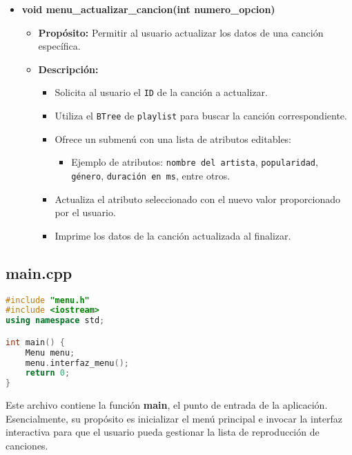 \documentclass[corference]{IEEEtran}
\begin{document}
\begin{flushleft}
\begin{itemize}
                \item \textbf{void menu\_actualizar\_cancion(int numero\_opcion)}
                \begin{itemize}
                    \item \textbf{Propósito:} 
                    Permitir al usuario actualizar los datos de una canción específica.
                    \item \textbf{Descripción:} 
                    \begin{itemize}
                        \item Solicita al usuario el \texttt{ID} de la canción a actualizar.
                        \item Utiliza el \texttt{BTree} de \texttt{playlist} para buscar la canción correspondiente.
                        \item Ofrece un submenú con una lista de atributos editables:
                        \begin{itemize}
                            \item Ejemplo de atributos: \texttt{nombre del artista}, \texttt{popularidad}, \texttt{género}, \texttt{duración en ms}, entre otros.
                        \end{itemize}
                        \item Actualiza el atributo seleccionado con el nuevo valor proporcionado por el usuario.
                        \item Imprime los datos de la canción actualizada al finalizar.
                    \end{itemize}
                \end{itemize}
            \end{itemize}

            \subsection{main.cpp}

            \begin{lstlisting}[language=C++, style=mystyle, caption={Código del main}]
#include "menu.h"
#include <iostream>
using namespace std;

int main() {
    Menu menu;
    menu.interfaz_menu();
    return 0;
}
            \end{lstlisting}

        \noindent\hspace*{4em}Este archivo contiene la función \textbf{main}, el punto de entrada de la aplicación. Esencialmente, su propósito es inicializar el menú principal e invocar la interfaz interactiva para que el usuario pueda gestionar la lista de reproducción de canciones.


\end{flushleft}
\end{document}
